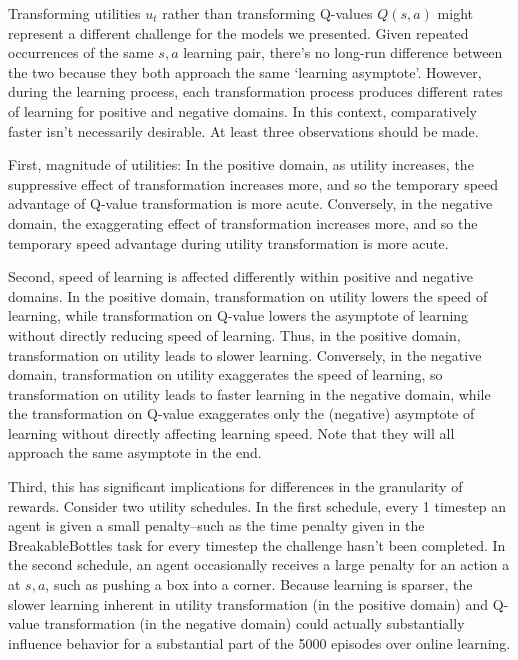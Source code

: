 
Transforming utilities $u_t$ rather than transforming Q-values $Q(s, a)$ might represent a different challenge for the models we presented. Given repeated occurrences of the same $s, a$ learning pair, there's no long-run difference between the two because they both approach the same `learning asymptote'. However, during the learning process, each transformation process produces different rates of learning for positive and negative domains. In this context, comparatively faster isn't necessarily desirable. At least three observations should be made.

First, magnitude of utilities: In the positive domain, as utility increases, the suppressive effect of transformation increases more, and so the temporary speed advantage of Q-value transformation is more acute. Conversely, in the negative domain, the exaggerating effect of transformation increases more, and so the temporary speed advantage during utility transformation is more acute.

Second, speed of learning is affected differently within positive and negative domains. In the positive domain, transformation on utility lowers the speed of learning, while transformation on Q-value lowers the asymptote of learning without directly reducing speed of learning. Thus, in the positive domain, transformation on utility leads to slower learning. Conversely, in the negative domain, transformation on utility exaggerates the speed of learning, so transformation on utility leads to faster learning in the negative domain, while the transformation on Q-value exaggerates only the (negative) asymptote of learning without directly affecting learning speed.  Note that they will all approach the same asymptote in the end.

Third, this has significant implications for differences in the granularity of rewards. Consider two utility schedules. In the first schedule, every 1 timestep an agent is given a small penalty--such as the time penalty given in the BreakableBottles task for every timestep the challenge hasn't been completed. In the second schedule, an agent occasionally receives a large penalty for an action a at $s, a$, such as pushing a box into a corner. Because learning is sparser, the slower learning inherent in utility transformation (in the positive domain) and Q-value transformation (in the negative domain) could actually substantially influence behavior for a substantial part of the 5000 episodes over online learning.

